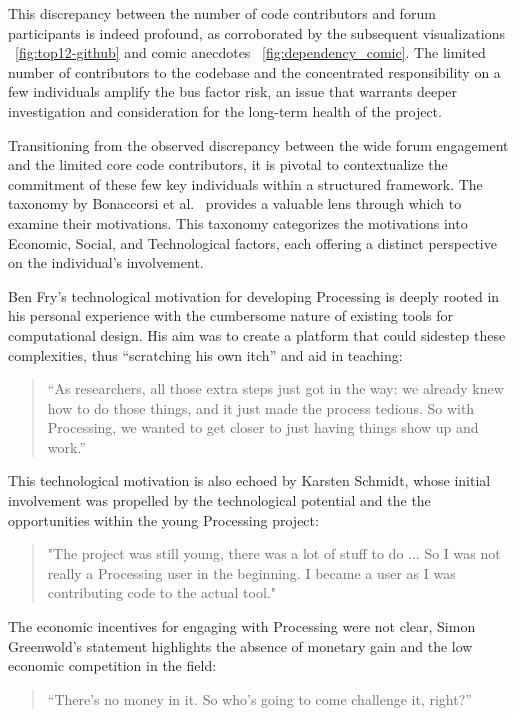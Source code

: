 This discrepancy between the number of code contributors and forum participants is indeed profound, as corroborated by the subsequent visualizations ~\ref{fig:top12-github} and comic anecdotes ~\ref{fig:dependency_comic}. The limited number of contributors to the codebase and the concentrated responsibility on a few individuals amplify the bus factor risk, an issue that warrants deeper investigation and consideration for the long-term health of the project.

Transitioning from the observed discrepancy between the wide forum engagement and the limited core code contributors, it is pivotal to contextualize the commitment of these few key individuals within a structured framework. The taxonomy by Bonaccorsi et al.~\cite{bonaccorsiComparingMotivationsIndividual2006} provides a valuable lens through which to examine their motivations. This taxonomy categorizes the motivations into Economic, Social, and Technological factors, each offering a distinct perspective on the individual's involvement.

Ben Fry’s technological motivation for developing Processing is deeply rooted in his personal experience with the cumbersome nature of existing tools for computational design. His aim was to create a platform that could sidestep these complexities, thus “scratching his own itch” and aid in teaching:

\begin{quote}
	“As researchers, all those extra steps just got in the way: we already knew how to do those things, and it just made the process tedious. So with Processing, we wanted to get closer to just having things show up and work.” 
\end{quote}

This technological motivation is also echoed by Karsten Schmidt, whose initial involvement was propelled by the technological potential and the the opportunities within the young Processing project:

\begin{quote}
"The project was still young, there was a lot of stuff to do ... So I was not really a Processing user in the beginning. I became a user as I was contributing code to the actual tool." 
\end{quote}

The economic incentives for engaging with Processing were not clear, Simon Greenwold’s statement highlights the absence of monetary gain and the low economic competition in the field:
\begin{quote}
	“There's no money in it. So who's going to come challenge it, right?” 
\end{quote}
	
